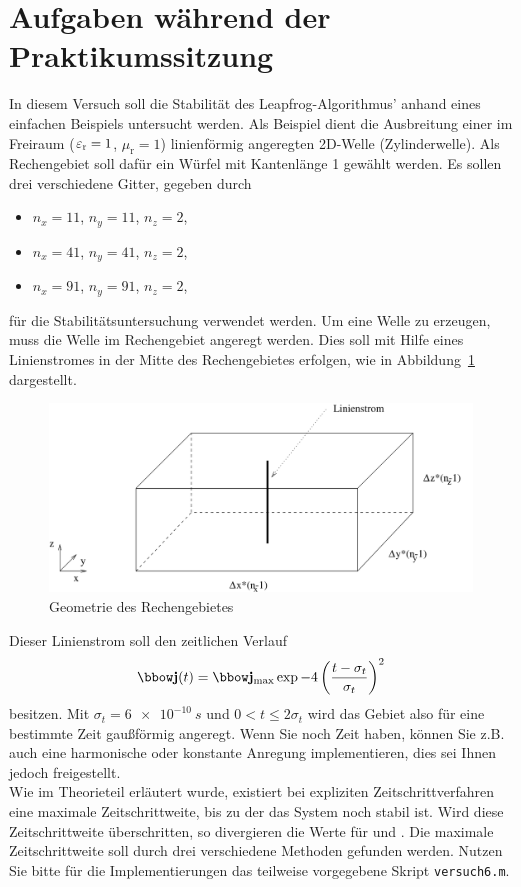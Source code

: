 \documentclass[Protokollheft.tex]{subfiles}
\begin{document}
\section{Aufgaben während der Praktikumssitzung}
In diesem Versuch soll die Stabilität des Leapfrog-Algorithmus' anhand eines einfachen Beispiels untersucht werden.
Als Beispiel dient die Ausbreitung einer im Freiraum ($\varepsilon_\text{r}=1$, $\mu_\text{r}=1$) linienförmig angeregten 2D-Welle (Zylinderwelle). Als Rechengebiet soll dafür ein Würfel mit Kantenlänge 1 gewählt werden. Es sollen drei verschiedene Gitter, gegeben durch
\begin{itemize}
    \item $n_x=11$, $n_y=11$, $n_z=2$,
    \item $n_x=41$, $n_y=41$, $n_z=2$,
    \item $n_x=91$, $n_y=91$, $n_z=2$,
\end{itemize}
für die Stabilitätsuntersuchung verwendet werden. Um eine Welle zu erzeugen, muss die Welle im Rechengebiet angeregt werden. Dies soll mit Hilfe eines
Linienstromes in der Mitte des Rechengebietes erfolgen, wie in
Abbildung~\ref{fig:anregung} dargestellt.\\

\begin{figure}[h]
    \centering
    \includegraphics[scale=0.7]{v6_praktskizze.pdf}
    \caption{Geometrie des Rechengebietes}\label{fig:anregung}
\end{figure}

\noindent Dieser Linienstrom soll den zeitlichen Verlauf
\begin{align}
    \jfit(t) = \jfit_{\text{max}} \exp{-4\left(\frac{t-\sigma_t}{\sigma_t}\right)^2}
\end{align}
besitzen. Mit $\sigma_t=\SI{6e-10}{s}$ und $0 < t\leq 2 \sigma_t$ wird das Gebiet also für eine bestimmte Zeit gaußförmig angeregt. Wenn Sie noch Zeit haben, können Sie z.B. auch eine harmonische oder konstante Anregung implementieren, dies sei Ihnen jedoch freigestellt.\\
\noindent
Wie im Theorieteil erläutert wurde, existiert bei expliziten Zeitschrittverfahren eine maximale Zeitschrittweite, bis zu
der das System noch stabil ist. Wird diese Zeitschrittweite
überschritten, so divergieren die Werte für {\efit} und {\hfit}. Die maximale
Zeitschrittweite soll durch drei verschiedene Methoden gefunden werden. Nutzen Sie bitte für die Implementierungen das teilweise vorgegebene Skript \lstinline{versuch6.m}.
\end{document}
